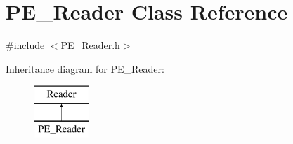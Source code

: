 \hypertarget{classPE__Reader}{
\section{PE\_\-Reader Class Reference}
\label{classPE__Reader}
}


{\ttfamily \#include $<$PE\_\-Reader.h$>$}

Inheritance diagram for PE\_\-Reader:\begin{figure}[H]
\begin{center}
\leavevmode
\includegraphics[height=2cm]{classPE__Reader}
\end{center}
\end{figure}
